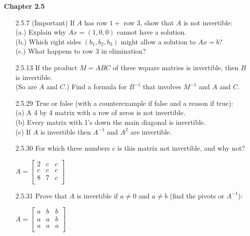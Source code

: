 \documentclass[10pt,twoside,reqno]{article}
\begin{document}
\vspace{5mm}
\textbf{Chapter 2.5}
\begin{enumerate}
\item[2.5.7] (Important) If $A$ has row $1 +$ row $3$, show that $A$ is  not invertible: \\
(a.) Explain why $Ax = (1, 0, 0)$ cannot have a solution. \\
(b.) Which right sides $(b_1, b_2, b_3)$ might allow a solution to $Ax = b$?\\
(c.) What happens to row 3 in elimination?\\
\item[2.5.13] If the product $M = ABC$ of three wquare matries is invertible, then $B$ is invertible. \\
(So are $A$ and $C$.) Find a formula for $B^{-1}$ that involves $M^{-1}$ and $A$ and $C$.\\
\item[2.5.29] True or false (with a counterexample if false and a reason if true):\\
(a) A 4 by 4 matrix with a row of zeros is not invertible.\\
(b) Every matrix with 1's down the main diagonal is invertible.\\
(c) If $A$ is invertible then $A^{-1}$ and $A^2$ are invertible.\\
\item[2.5.30] For which three numbers $c$ is this matrix not invertible, and why not?\\
\begin{center}
$
$$
A=
\begin{bmatrix}
2&c&c\\
c&c&c\\
8&7&c\\
\end{bmatrix}
$$
$
\end{center}
\item[2.5.31] Prove that $A$ is invertible if $a\neq 0$ and $a \neq b$ (find the pivots or $A^{-1}$):\\
\begin{center}
$
$$
A=
\begin{bmatrix}
a&b&b\\
a&a&b\\
a&a&a\\
\end{bmatrix}
$$
$
\end{center}
\end{enumerate}
\vspace{5mm}
\end{document}
